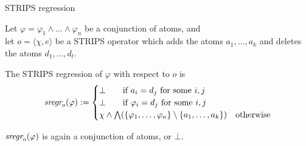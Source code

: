 \documentclass{gkibeamer}
\begin{document}
\begin{frame}{STRIPS regression}
  \begin{definition}
    Let $\varphi = \varphi_1 \land \dots \land \varphi_n$ be a
    conjunction of atoms, and \\ let $o = \langle \chi, e\rangle$ be a
    STRIPS operator which adds the atoms $a_1, \dots, a_k$ and deletes
    the atoms $d_1, \dots, d_l$.

    \medskip

    The \alert{STRIPS regression} of $\varphi$ with respect to $o$ is
    \[
      \textit{sregr}_{o}(\varphi) := \begin{cases}
        \bot \qquad \text{if~} a_i = d_j \text{~for some~} i, j \\
        \bot \qquad \text{if~} \varphi_i = d_j \text{~for some~} i, j \\
        \chi \land \bigwedge (\{\varphi_1, \dots,
        \varphi_n\} \setminus \{a_1, \dots, a_k\})
        & \text{otherwise}
      \end{cases}
    \]
  \end{definition}
   $\textit{sregr}_{o}(\varphi)$ is again a conjunction of
  atoms, or $\bot$.
\end{frame}
\end{document}
